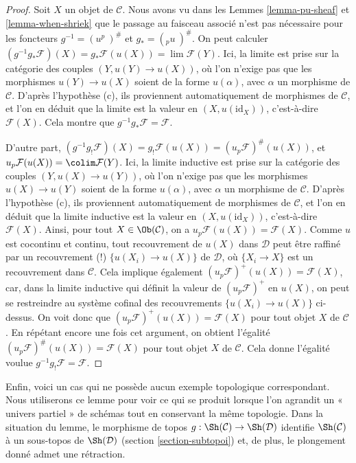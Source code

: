 \begin{proof}
Soit $X$ un objet de $\mathcal{C}$.
Nous avons vu dans les Lemmes \ref{lemma-pu-sheaf} et
\ref{lemma-when-shriek} que le passage au faisceau associé n’est pas
nécessaire pour les foncteurs
$g^{-1} = (u^p\ )^\#$ et $g_{*} = ({}_pu\ )^\#$.
On peut calculer
$(g^{-1}g_{*}\mathcal{F})(X) = g_{*}\mathcal{F}(u(X))
= \lim \mathcal{F}(Y)$. Ici, la limite est prise sur la catégorie des couples
$(Y, u(Y) \to u(X))$, où l’on n’exige pas que les morphismes
$u(Y) \to u(X)$ soient de la forme $u(\alpha)$, avec $\alpha$ un morphisme de
$\mathcal{C}$. D’après l’hypothèse (c), ils proviennent automatiquement de
morphismes de $\mathcal{C}$, et l’on en déduit que la limite est la valeur en
$(X, u(\text{id}_X))$, c’est-à-dire $\mathcal{F}(X)$.
Cela montre que $g^{-1}g_{*}\mathcal{F} = \mathcal{F}$.

\medskip\noindent
D’autre part, $(g^{-1}g_{!}\mathcal{F})(X) =
g_{!}\mathcal{F}(u(X)) = (u_p\mathcal{F})^\#(u(X))$, et
$u_p\mathcal{F}(u(X)) = \colim \mathcal{F}(Y)$.
Ici, la limite inductive est prise sur la catégorie des couples
$(Y, u(X) \to u(Y))$, où l’on n’exige pas que les morphismes
$u(X) \to u(Y)$ soient de la forme $u(\alpha)$, avec $\alpha$ un morphisme de
$\mathcal{C}$. D’après l’hypothèse (c), ils proviennent automatiquement de
morphismes de $\mathcal{C}$, et l’on en déduit que la limite inductive est la
valeur en $(X, u(\text{id}_X))$, c’est-à-dire $\mathcal{F}(X)$. Ainsi, pour
tout $X \in \Ob(\mathcal{C})$, on a
$u_p\mathcal{F}(u(X)) = \mathcal{F}(X)$.
Comme $u$ est cocontinu et continu, tout recouvrement de $u(X)$ dans
$\mathcal{D}$ peut être raffiné par un recouvrement (!)
$\{u(X_i) \to u(X)\}$ de $\mathcal{D}$, où $\{X_i \to X\}$ est un
recouvrement dans $\mathcal{C}$. Cela implique également
$(u_p\mathcal{F})^+(u(X)) = \mathcal{F}(X)$, car, dans la limite inductive qui
définit la valeur de $(u_p\mathcal{F})^+$ en $u(X)$, on peut se restreindre au
système cofinal des recouvrements $\{u(X_i) \to u(X)\}$ ci-dessus. On voit
donc que $(u_p\mathcal{F})^+(u(X)) = \mathcal{F}(X)$ pour tout objet $X$ de
$\mathcal{C}$. En répétant encore une fois cet argument, on obtient l’égalité
$(u_p\mathcal{F})^\#(u(X)) = \mathcal{F}(X)$ pour tout objet $X$ de
$\mathcal{C}$. Cela donne l’égalité voulue
$g^{-1}g_!\mathcal{F} = \mathcal{F}$.
\end{proof}

\noindent
Enfin, voici un cas qui ne possède aucun exemple topologique correspondant.
Nous utiliserons ce lemme pour voir ce qui se produit lorsque l’on agrandit
un « univers partiel » de schémas tout en conservant la même topologie. Dans
la situation du lemme, le morphisme de topos
$g : \Sh(\mathcal{C}) \to \Sh(\mathcal{D})$ identifie
$\Sh(\mathcal{C})$ à un sous-topos de $\Sh(\mathcal{D})$
(section \ref{section-subtopoi}) et, de plus, le plongement donné admet une
rétraction.

